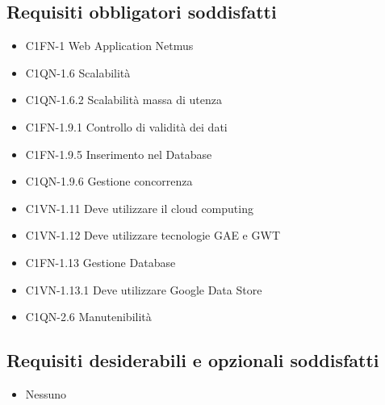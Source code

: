 \subsection*{Requisiti obbligatori soddisfatti}
\begin{itemize}
    \item C1FN-1 Web Application Netmus
    \item C1QN-1.6 Scalabilit\`a
    \item C1QN-1.6.2 Scalabilit\`a massa di utenza
    \item C1FN-1.9.1 Controllo di validit\`a dei dati
	\item C1FN-1.9.5 Inserimento nel Database
	\item C1QN-1.9.6 Gestione concorrenza
	\item C1VN-1.11 Deve utilizzare il cloud computing
	\item C1VN-1.12 Deve utilizzare tecnologie GAE e GWT
	\item C1FN-1.13 Gestione Database
	\item C1VN-1.13.1 Deve utilizzare Google Data Store
	\item C1QN-2.6 Manutenibilit\`a
\end{itemize}
\subsection*{Requisiti desiderabili e opzionali soddisfatti}
\begin{itemize}
    \item Nessuno
\end{itemize}
